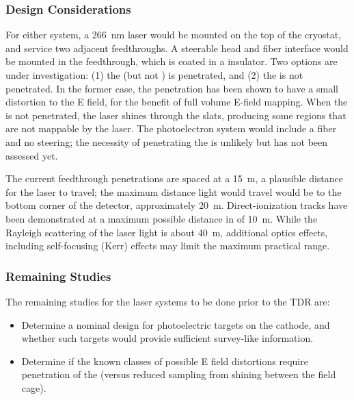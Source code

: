 \subsubsection{Design Considerations}

For either system, a \SI{266}{\nano\m} laser would be mounted on the top of the cryostat, and service two adjacent feedthroughs. A steerable head and fiber interface would be mounted in the feedthrough, which is coated in a insulator. Two options are under investigation: (1) the  (but not ) is penetrated, and (2) the  is not penetrated. In the former case, the  penetration has been shown to have  a small distortion to the E field, for the benefit of full volume E-field mapping. When the  is not penetrated, the laser shines %
through the slats, producing some regions that are not mappable by the laser. The photoelectron system would include a fiber and no steering; the necessity of penetrating the  is unlikely but has not been assessed yet.

The current feedthrough penetrations are spaced at a \SI{15}{\m}, a plausible distance for the laser  to travel; the maximum distance light would travel would be to the bottom corner of the detector, approximately \SI{20}{\m}. Direct-ionization tracks have been demonstrated at a maximum possible distance in  of \SI{10}{\m}. While the Rayleigh scattering of the laser light is about \SI{40}{\m}, additional optics effects, including self-focusing (Kerr) effects may limit the maximum practical range.

\subsubsection{Remaining Studies}

The remaining studies for the laser systems to be done prior to the TDR are:

\begin{itemize}
\item Determine %
a nominal design for photoelectric targets on the cathode, and whether %
such targets would provide sufficient survey-like information.
\item Determine if the known classes of possible E field distortions require penetration of the  (versus reduced sampling from shining between the field cage). 
\end{itemize}


